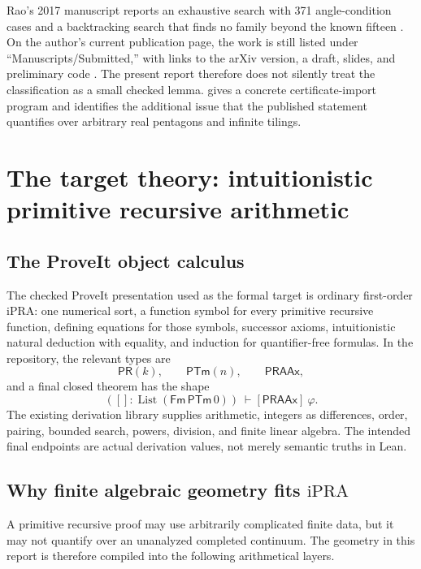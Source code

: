 \documentclass[11pt]{article}
\theoremstyle{remark}
\newcommand{\ipra}{\mathrm{iPRA}}
\newcommand{\PRAAx}{\mathsf{PRAAx}}
\newcommand{\PTm}{\mathsf{PTm}}
\newcommand{\Fm}{\mathsf{Fm}}
\begin{document}
Rao's 2017 manuscript reports an exhaustive search with 371 angle-condition
cases and a backtracking search that finds no family beyond the known fifteen
\cite{Rao2017}.  On the author's current publication page, the work is still
listed under ``Manuscripts/Submitted,'' with links to the arXiv version, a
draft, slides, and preliminary code \cite{RaoPublications}.  The present report
therefore does not silently treat the classification as a small checked lemma.
 gives a concrete certificate-import program and identifies the
additional issue that the published statement quantifies over arbitrary real
pentagons and infinite tilings.

\section{The target theory: intuitionistic primitive recursive arithmetic}
\label{sec:ipra}

\subsection{The ProveIt object calculus}

The checked ProveIt presentation used as the formal target is ordinary
first-order \(\ipra\): one numerical sort, a function symbol for every
primitive recursive function, defining equations for those symbols,
successor axioms, intuitionistic natural deduction with equality, and
induction for quantifier-free formulas.  In the repository, the relevant types
are
\[
  \mathsf{PR}(k),\qquad \PTm(n),\qquad \PRAAx,
\]
and a final closed theorem has the shape
\[
  ([]:\operatorname{List}(\Fm\,\PTm\,0))\ \vdash[\PRAAx]\ \varphi.
\]
The existing derivation library supplies arithmetic, integers as differences,
order, pairing, bounded search, powers, division, and finite linear algebra.
The intended final endpoints are actual derivation values, not merely semantic
truths in Lean.

\subsection{Why finite algebraic geometry fits \texorpdfstring{\(\ipra\)}{iPRA}}

A primitive recursive proof may use arbitrarily complicated finite data, but
it may not quantify over an unanalyzed completed continuum.  The geometry in
this report is therefore compiled into the following arithmetical layers.
\end{document}
